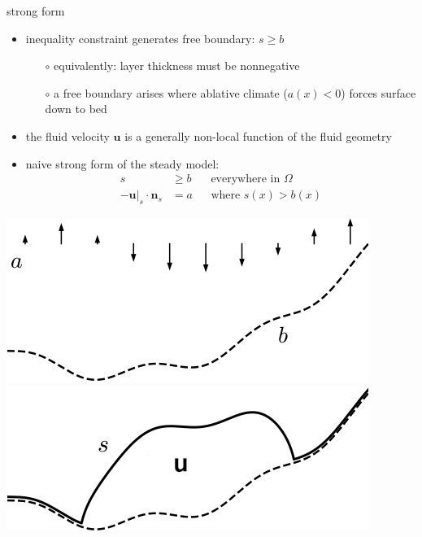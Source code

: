 \documentclass[svgnames,
               hyperref={colorlinks,citecolor=DeepPink4,linkcolor=FireBrick,urlcolor=Maroon},
               usepdftitle=false]  %
               {beamer}
\newcommand{\bn}{\mathbf{n}}
\newcommand{\bu}{\mathbf{u}}
\begin{document}
\begin{frame}{strong form}

\begin{itemize}
\item inequality constraint generates free boundary: $s \ge b$
    \begin{itemize}
    \item[$\circ$] equivalently: layer thickness must be nonnegative
    \item[$\circ$] a free boundary arises where ablative climate ($a(x) < 0$) forces surface down to bed
    \end{itemize}
\item the fluid velocity $\bu$ is a generally non-local function of the fluid geometry
\item naive strong form of the steady model: %
\begin{align*}
s &\ge b                    & &\text{everywhere in } \Omega \\
-\bu|_s \cdot \bn_s &= a    & &\text{where } s(x) > b(x)
\end{align*}
\end{itemize}

\bigskip
\hfill \mbox{\includegraphics[height=0.2\textheight]{images/domain-data.png} \hspace{7mm} \includegraphics[height=0.2\textheight]{images/domain-velocity.png}}
\end{frame}
\end{document}
